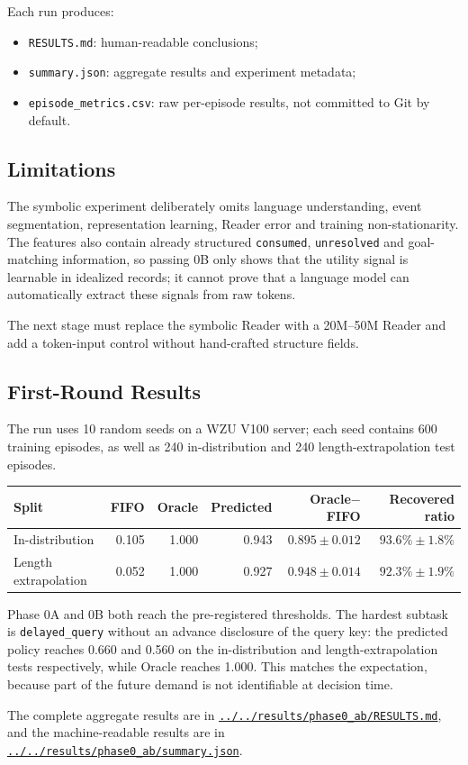 Each run produces:

\begin{itemize}
  \item \texttt{RESULTS.md}: human-readable conclusions;
  \item \texttt{summary.json}: aggregate results and experiment metadata;
  \item \texttt{episode\_metrics.csv}: raw per-episode results, not committed to Git by default.
\end{itemize}

\subsection{Limitations}

The symbolic experiment deliberately omits language understanding, event segmentation, representation learning, Reader error and training non-stationarity. The features also contain already structured \texttt{consumed}, \texttt{unresolved} and goal-matching information, so passing 0B only shows that the utility signal is learnable in idealized records; it cannot prove that a language model can automatically extract these signals from raw tokens.

The next stage must replace the symbolic Reader with a 20M--50M Reader and add a token-input control without hand-crafted structure fields.

\subsection{First-Round Results}

The run uses 10 random seeds on a WZU V100 server; each seed contains 600 training episodes, as well as 240 in-distribution and 240 length-extrapolation test episodes.

\begin{table}[htbp]\centering
\begin{tabular}{lrrrrr}\toprule
Split & FIFO & Oracle & Predicted & Oracle$-$FIFO & Recovered ratio\\
\midrule
In-distribution & 0.105 & 1.000 & 0.943 & $0.895\pm0.012$ & $93.6\%\pm1.8\%$\\
Length extrapolation & 0.052 & 1.000 & 0.927 & $0.948\pm0.014$ & $92.3\%\pm1.9\%$\\
\bottomrule
\end{tabular}
\end{table}

Phase 0A and 0B both reach the pre-registered thresholds. The hardest subtask is \texttt{delayed\_query} without an advance disclosure of the query key: the predicted policy reaches 0.660 and 0.560 on the in-distribution and length-extrapolation tests respectively, while Oracle reaches 1.000. This matches the expectation, because part of the future demand is not identifiable at decision time.

The complete aggregate results are in \href{../../results/phase0_ab/RESULTS.md}{\texttt{../../results/phase0\_ab/RESULTS.md}}, and the machine-readable results are in \href{../../results/phase0_ab/summary.json}{\texttt{../../results/phase0\_ab/summary.json}}.
